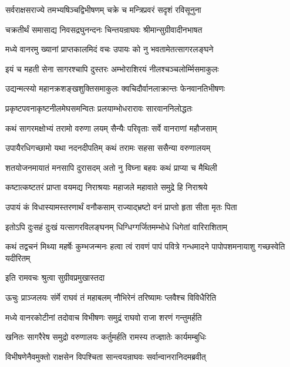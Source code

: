 \twolineshloka
{सर्वराक्षसराज्ये तमभ्यषिञ्चद्विभीषणम्}
{चक्रे च मन्त्रिप्रवरं सदृशं रविसूनुना}%

\twolineshloka
{चक्रतीर्थं समासाद्य निवसद्रघुनन्दनः}
{चिन्तयन्राघवः श्रीमान्सुग्रीवादीनभाषत}%

\twolineshloka
{मध्ये वानरमु ख्यानां प्राप्तकालमिदं वचः}
{उपायः को नु भवतामेतत्सागरलङ्घने}%

\twolineshloka
{इयं च महती सेना सागरश्चापि दुस्तरः}
{अम्भोराशिरयं नीलश्चञ्चलोर्म्मिसमाकुलः}%

\twolineshloka
{उद्यन्मत्स्यो महानक्रशङ्खशुक्तिसमाकुलः}
{क्वचिदौर्वानलाक्रान्तः फेनवानतिभीषणः}%

\twolineshloka
{प्रकृष्टपवनाकृष्टनीलमेघसमन्वितः}
{प्रलयाम्भोधरारावः सारवाननिलोद्धतः}%

\twolineshloka
{कथं सागरमक्षोभ्यं तरामो वरुणा लयम्}
{सैन्यैः परिवृताः सर्वे वानराणां महौजसाम्}%

\twolineshloka
{उपायैरधिगच्छामो यथा नदनदीपतिम्}
{कथं तरामः सहसा ससैन्या वरुणालयम्}%

\twolineshloka
{शतयोजनमायातं मनसापि दुरासदम्}
{अतो नु विघ्ना बहवः कथं प्राप्या च मैथिली}%

\twolineshloka
{कष्टात्कष्टतरं प्राप्ता वयमद्य निराश्रयाः}
{महाजले महावाते समुद्रे हि निराश्रये}%

\twolineshloka
{उपायं कं विधास्यामस्तरणार्थं वनौकसाम्}
{राज्याद्भ्रष्टो वनं प्राप्तो हृता सीता मृतः पिता}%

\twolineshloka
{इतोऽपि दुःसहं दुःखं यत्सागरविलङ्घनम्}
{धिग्धिग्गर्जितमम्भोधे धिगेतां वारिराशिताम्}%

\threelineshloka
{कथं तद्वचनं मिथ्या महर्षेः कुम्भजन्मनः}
{हत्वा त्वं रावणं पापं पवित्रे गन्धमादने}
{पापोपशमनायाशु गच्छस्वेति यदीरितम्}%


\onelineshloka
{इति रामवचः श्रुत्वा सुग्रीवप्रमुखास्तदा}%

\twolineshloka
{ऊचुः प्राञ्जलयः संर्मे राघवं तं महाबलम्}
{नौभिरेनं तरिष्यामः प्लवैश्च विविधैरिति}%

\twolineshloka
{मध्ये वानरकोटीनां तदोवाच विभीषणः}
{समुद्रं राघवो राजा शरणं गन्तुमर्हति}%

\twolineshloka
{खनितः सागरैरेष समुद्रो वरुणालयः}
{कर्तुमर्हति रामस्य तज्ज्ञातेः कार्यमम्बुधिः}%

\twolineshloka
{विभीषणेनैवमुक्तो राक्षसेन विपश्चिता}
{सान्त्वयन्राघवः सर्वान्वानरानिदमब्रवीत्}%

